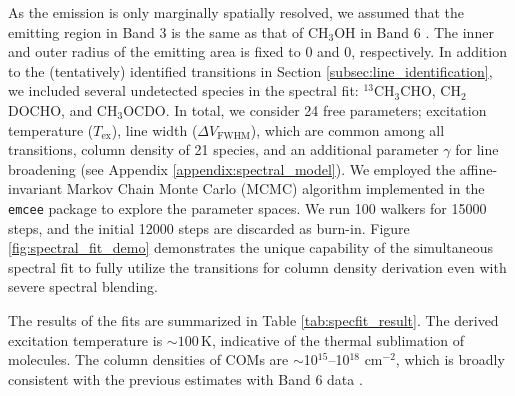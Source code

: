 \documentclass[linenumbers, twocolumn, twocolappendix, astrosymb, times]{aastex631}
\newcommand{\methanol}{CH$_3$OH\xspace}
\begin{document}
As the emission is only marginally spatially resolved, we assumed that the emitting region in Band 3 is the same as that of \methanol in Band 6 \citep{Tobin2023}. The inner and outer radius of the emitting area is fixed to 0 and 0, respectively. 
In addition to the (tentatively) identified transitions in Section \ref{subsec:line_identification}, we included several undetected species in the spectral fit: $^{13}$CH$_3$CHO, CH$_2$DOCHO, and CH$_3$OCDO. In total, we consider 24 free parameters; excitation temperature ($T_\mathrm{ex}$), line width ($\Delta V_\mathrm{FWHM}$), which are common among all transitions, column density of 21 species, and an additional parameter $\gamma$ for line broadening (see Appendix \ref{appendix:spectral_model}). 
We employed the affine-invariant Markov Chain Monte Carlo (MCMC) algorithm implemented in the \texttt{emcee} package \citep{emcee} to explore the parameter spaces. We run 100 walkers for 15000 steps, and the initial 12000 steps are discarded as burn-in. Figure \ref{fig:spectral_fit_demo} demonstrates the unique capability of the simultaneous spectral fit to fully utilize the transitions for column density derivation even with severe spectral blending. 

The results of the fits are summarized in Table \ref{tab:specfit_result}. The derived excitation temperature is $\sim100$\,K, indicative of the thermal sublimation of molecules. The column densities of COMs are $\sim$10$^{15}$--10$^{18}$ cm$^{-2}$, which is broadly consistent with the previous estimates with Band 6 data \citep{Lee2019}. 
\end{document}
